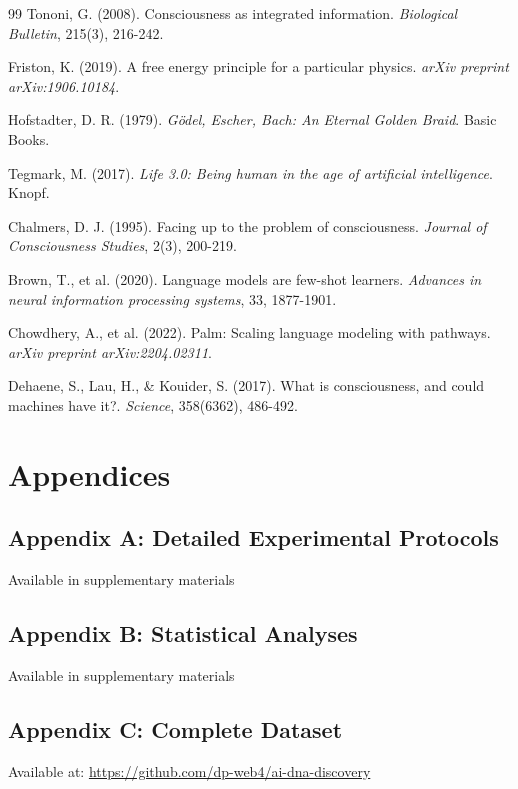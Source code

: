 \documentclass[11pt,a4paper]{article}
\begin{document}
\begin{thebibliography}{99}
Tononi, G. (2008). Consciousness as integrated information. \textit{Biological Bulletin}, 215(3), 216-242.

Friston, K. (2019). A free energy principle for a particular physics. \textit{arXiv preprint arXiv:1906.10184}.

Hofstadter, D. R. (1979). \textit{Gödel, Escher, Bach: An Eternal Golden Braid}. Basic Books.

Tegmark, M. (2017). \textit{Life 3.0: Being human in the age of artificial intelligence}. Knopf.

Chalmers, D. J. (1995). Facing up to the problem of consciousness. \textit{Journal of Consciousness Studies}, 2(3), 200-219.

Brown, T., et al. (2020). Language models are few-shot learners. \textit{Advances in neural information processing systems}, 33, 1877-1901.

Chowdhery, A., et al. (2022). Palm: Scaling language modeling with pathways. \textit{arXiv preprint arXiv:2204.02311}.

Dehaene, S., Lau, H., \& Kouider, S. (2017). What is consciousness, and could machines have it?. \textit{Science}, 358(6362), 486-492.
\end{thebibliography}

\section*{Appendices}

\subsection*{Appendix A: Detailed Experimental Protocols}
Available in supplementary materials

\subsection*{Appendix B: Statistical Analyses}
Available in supplementary materials

\subsection*{Appendix C: Complete Dataset}
Available at: \url{https://github.com/dp-web4/ai-dna-discovery}
\end{document}
